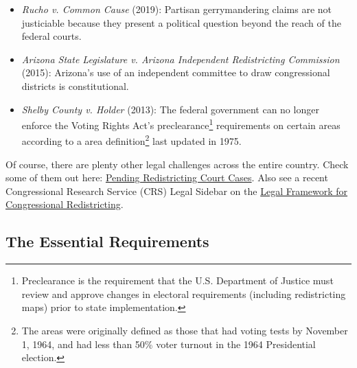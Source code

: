 \documentclass[10pt]{article}
\begin{document}
	\begin{itemize}
		\item \textit{Rucho v. Common Cause} (2019): Partisan gerrymandering claims are not justiciable because they present a political question beyond the reach of the federal courts.
		\item \textit{Arizona State Legislature v. Arizona Independent Redistricting Commission} (2015): Arizona's use of an independent committee to draw congressional districts is constitutional. 
		\item \textit{Shelby County v. Holder} (2013): The federal government can no longer enforce the Voting Rights Act's preclearance\footnote{Preclearance is the requirement that the U.S. Department of Justice must review and approve changes in electoral requirements (including redistricting maps) prior to state implementation.} requirements on certain areas according to a area definition\footnote{The areas were originally defined as those that had voting tests by November 1, 1964, and had less than 50\% voter turnout in the 1964 Presidential election.} last updated in 1975.
	\end{itemize}
	
	\noindent Of course, there are plenty other legal challenges across the entire country. Check some of them out here: \href{https://redistricting.lls.edu/cases/?sortby=-updated&page=1}{Pending Redistricting Court Cases}. Also see a recent Congressional Research Service (CRS) Legal Sidebar on the \href{https://crsreports.congress.gov/product/pdf/LSB/LSB10639}{Legal Framework for Congressional Redistricting}.
	
	\subsection{The Essential Requirements}
	
\end{document}
